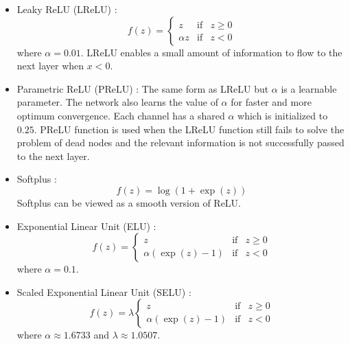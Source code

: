\documentclass[12pt]{report}
\numberwithin{equation}{section}
\begin{document}
\begin{itemize}
\item Leaky ReLU (LReLU) \textbf{\cite{Maas2013}}:
\begin{equation}\label{eqn:lrelu}
f(z) = \left\{\begin{array}{lcr}
		z & \text{if} & z \geq 0 \\
		\alpha z & \text{if} & z < 0
		\end{array}\right.
\end{equation}
where $\alpha=0.01$. LReLU enables a small amount of information to flow to the next layer when $x < 0$.
\item Parametric ReLU (PReLU) \textbf{\cite{10.1109/ICCV.2015.123}}: The same form as LReLU but $\alpha$ is a learnable parameter. The network also learns the value of $\alpha$ for faster and more optimum convergence. Each channel has a shared $\alpha$ which is initialized to $0.25$.  PReLU function is used when the LReLU function still fails to solve the problem of dead nodes and the relevant information is not successfully passed to the next layer.
\item Softplus \textbf{\cite{10.5555/3104322.3104425}}: 
\begin{equation}
f(z) = \log(1 + \exp(z))
\end{equation}
Softplus can be viewed as a smooth version of ReLU.
\item Exponential Linear Unit (ELU) \textbf{\cite{Clevert2015FastAA}}:
\begin{equation}\label{eqn:elu}
f(z) = \left\{\begin{array}{lcr}
		z & \text{if} & z \geq 0 \\
		\alpha(\exp(z)-1) & \text{if} & z < 0
		\end{array}\right.
\end{equation}
where $\alpha=0.1$.
\item Scaled Exponential Linear Unit (SELU) \textbf{\cite{DBLP:journals/corr/KlambauerUMH17}}:
\begin{equation}\label{eqn:selu}
f(z) = \lambda\left\{\begin{array}{lcr}
		z & \text{if} & z \geq 0 \\
		\alpha(\exp(z)-1) & \text{if} & z < 0
		\end{array}\right.
\end{equation}
where $\alpha \approx 1.6733$ and $\lambda \approx 1.0507$.
\end{itemize}
\end{document}
